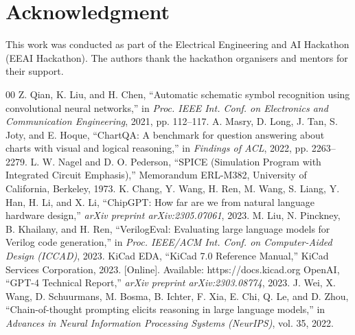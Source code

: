 \documentclass[conference]{IEEEtran}
\begin{document}
\section*{Acknowledgment}

This work was conducted as part of the Electrical Engineering and AI Hackathon (EEAI Hackathon). The authors thank the hackathon organisers and mentors for their support.

\begin{thebibliography}{00}
 Z. Qian, K. Liu, and H. Chen, ``Automatic schematic symbol recognition using convolutional neural networks,'' in \textit{Proc. IEEE Int. Conf. on Electronics and Communication Engineering}, 2021, pp. 112--117.
 A. Masry, D. Long, J. Tan, S. Joty, and E. Hoque, ``ChartQA: A benchmark for question answering about charts with visual and logical reasoning,'' in \textit{Findings of ACL}, 2022, pp. 2263--2279.
 L. W. Nagel and D. O. Pederson, ``SPICE (Simulation Program with Integrated Circuit Emphasis),'' Memorandum ERL-M382, University of California, Berkeley, 1973.
 K. Chang, Y. Wang, H. Ren, M. Wang, S. Liang, Y. Han, H. Li, and X. Li, ``ChipGPT: How far are we from natural language hardware design,'' \textit{arXiv preprint arXiv:2305.07061}, 2023.
 M. Liu, N. Pinckney, B. Khailany, and H. Ren, ``VerilogEval: Evaluating large language models for Verilog code generation,'' in \textit{Proc. IEEE/ACM Int. Conf. on Computer-Aided Design (ICCAD)}, 2023.
 KiCad EDA, ``KiCad 7.0 Reference Manual,'' KiCad Services Corporation, 2023. [Online]. Available: https://docs.kicad.org
 OpenAI, ``GPT-4 Technical Report,'' \textit{arXiv preprint arXiv:2303.08774}, 2023.
 J. Wei, X. Wang, D. Schuurmans, M. Bosma, B. Ichter, F. Xia, E. Chi, Q. Le, and D. Zhou, ``Chain-of-thought prompting elicits reasoning in large language models,'' in \textit{Advances in Neural Information Processing Systems (NeurIPS)}, vol. 35, 2022.
\end{thebibliography}
\end{document}
